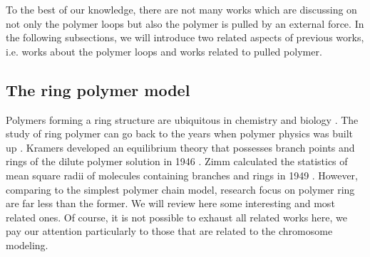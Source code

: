 To the best of our knowledge, there are not many works which are discussing on not only the polymer loops but also the polymer is pulled by an external force. In the following subsections, we will introduce two related aspects of previous works, i.e. works about the polymer loops and works related to pulled polymer. 

\subsection{The ring polymer model}
\label{sub:the_ring_polymer_model}

Polymers forming a ring structure are ubiquitous in chemistry and biology \cite{Halverson2014,Richter2015}. The study of ring polymer can go back to the years when polymer physics was built up \cite{Kramers1946,Zimm1949}. Kramers developed an equilibrium theory that possesses branch points and rings of the dilute polymer solution in 1946 \cite{Kramers1946}. Zimm calculated the statistics of mean square radii of molecules containing branches and rings in 1949 \cite{Zimm1949}. However, comparing to the simplest polymer chain model, research focus on polymer ring are far less than the former. We will review here some interesting and most related ones. Of course, it is not possible to exhaust all related works here, we pay our attention particularly to those that are related to the chromosome modeling.

